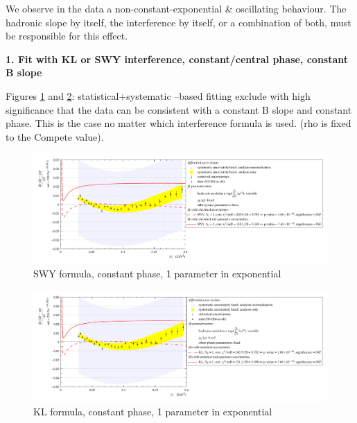 
We observe in the data a non-constant-exponential \& oscillating behaviour.
The hadronic slope by itself, the interference by itself, or a combination of both, must be
responsible for this effect.

{\bf 1. Fit with KL or SWY interference, constant/central phase, constant B slope}

Figures \ref{fig:90,SWY,con,1} and \ref{fig:90,KL,con,1}: statistical+systematic –based fitting exclude with high significance that the data can be
consistent with a constant B slope and constant phase. This is the case no matter which
interference formula is used. (rho is fixed to the Compete value).

\begin{figure}
\begin{center}
\includegraphics[width=18cm]{simone/90/SWY,con,1,stat-stat+syst.pdf}
\vskip-3mm
\caption{SWY formula, constant phase, 1 parameter in exponential}
\label{fig:90,SWY,con,1}
\end{center}
\end{figure}

\begin{figure}
\begin{center}
\includegraphics[width=18cm]{simone/90/KL,con,1,stat-stat+syst.pdf}
\vskip-3mm
\caption{KL formula, constant phase, 1 parameter in exponential}
\label{fig:90,KL,con,1}
\end{center}
\end{figure}

